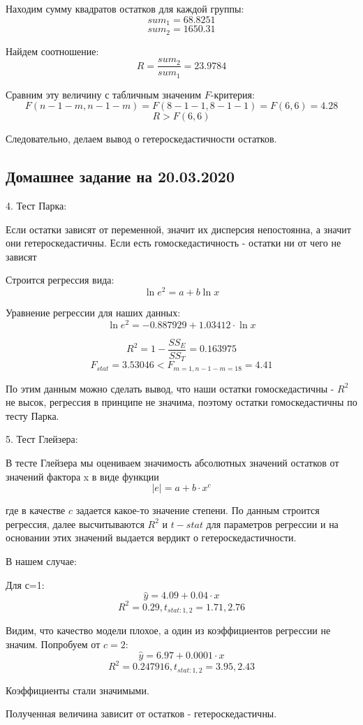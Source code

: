 \documentclass[aps,%
12pt,%
final,%
oneside,
onecolumn,%
musixtex, %
superscriptaddress,%
centertags]{article} %
\begin{document}
Находим сумму квадратов остатков для каждой группы:
$$sum_1 = 68.8251$$
$$sum_2 = 1650.31$$

Найдем соотношение:
$$R = \frac{sum_2}{sum_1} = 23.9784$$

Сравним эту величину с табличным значеним $F$-критерия: $$F(n-1-m,n-1-m) = F(8-1-1,8-1-1) = F(6,6) = 4.28$$
$$R >F(6,6)$$

Следовательно, делаем вывод о гетероскедастичности остатков.

\subsection{Домашнее задание на 20.03.2020}

4. Тест Парка:

Если остатки зависят от переменной, значит их дисперсия непостоянна, а значит они гетероскедастичны. Если есть гомоскедастичность - остатки ни от чего не зависят

Строится регрессия вида:
$$\ln e^2 = a + b\ln x$$

Уравнение регрессии для наших данных:
$$\ln e^2 = -0.887929 + 1.03412 \cdot \ln x$$

$$R^2 = 1 -\frac{SS_E}{SS_T}  = 0.163975$$
$$F_{stat} = 3.53046 < F_{m=1,n-1-m = 18} = 4.41$$

По этим данным можно сделать вывод, что наши остатки гомоскедастичны - $R^2$ не высок, регрессия в принципе не значима, поэтому остатки гомоскедастичны по тесту Парка.

5. Тест Глейзера:

В тесте Глейзера мы оцениваем значимость абсолютных значений остатков от значений фактора x в виде функции
$$|e| = a + b\cdot x^c$$

где в качестве $c$ задается какое-то значение степени.
По данным строится регрессия, далее высчитываются $R^2$ и $t-stat$ для параметров регрессии и на основании этих значений выдается вердикт о гетероскедастичности.

В нашем случае:

Для с=1:
$$\hat{y} = 4.09+ 0.04\cdot x$$
$$R^2 = 0.29, t_{stat:1,2} =  1.71,2.76$$

Видим, что качество модели плохое, а один из коэффициентов регрессии не значим.
Попробуем от $c=2$:
$$\hat{y} = 6.97 + 0.0001\cdot x$$
$$R^2 = 0.247916, t_{stat:1,2} = 3.95,2.43$$

Коэффициенты стали значимыми.

Полученная величина зависит от остатков - гетероскедастичны.
\end{document}

